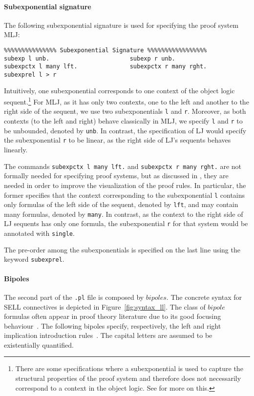 \documentclass{llncs}
\begin{document}
\paragraph{Subexponential signature}
%
The following subexponential signature is used for specifying the proof system MLJ:
\vspace{-1mm}

{\small
\begin{verbatim}
%%%%%%%%%%%%%%% Subexponential Signature %%%%%%%%%%%%%%%%%
subexp l unb.                       subexp r unb.            
subexpctx l many lft.               subexpctx r many rght.
subexprel l > r
\end{verbatim}
}

Intuitively, one subexponential corresponds to one context of the object logic sequent.\footnote{There are 
some specifications where a subexponential is used to capture the structural properties of the proof 
system and therefore does not necessarily correspond to a context in the object logic. See \cite{nigam.jlc}
for more on this.}
For MLJ, as it has only two
contexts, one to the left and another to the right side of the sequent, we use two subexponentials
\texttt{l} and \texttt{r}. Moreover, as both contexts (to the left and right) behave classically in MLJ, 
we specify \texttt{l} and \texttt{r} to be unbounded, denoted by \texttt{unb}. In contrast, 
the specification of LJ would specify the subexponential \texttt{r} to be linear, as the right side of LJ's 
sequents behaves linearly.

The commands \texttt{subexpctx l many lft.} and  \texttt{subexpctx r many rght.} are not formally needed for specifying proof systems, 
but as discussed 
in \cite{nigam14ebl}, they are needed in order to improve the visualization of the proof rules. 
In particular, the former specifies that the context corresponding to the subexponential \texttt{l} contains 
only formulas of the left side of the sequent, denoted by \texttt{lft}, and may contain many formulas, denoted 
by \texttt{many}. In contrast, as the context to the right side of LJ sequents has only one formula, the 
subexponential \texttt{r} for that system would be annotated with \texttt{single}.

The pre-order among the subexponentials is specified on the last line using the
keyword \texttt{subexprel}.

\vspace{-2mm}

\paragraph{Bipoles}
%
The second part of the \texttt{.pl} file is composed by $bipoles$. The concrete syntax for SELL connectives
is depicted in Figure~\ref{fig:syntax_ll}. The class of $bipole$ formulas often
appear in proof theory literature due to its good focusing
behaviour~\cite{andreoli92jlc}. The following bipoles specify, 
respectively, the left and right implication introduction rules~\cite{nigam.jlc}. The capital 
letters are assumed to be existentially quantified.
\vspace{-1mm}
\end{document}
